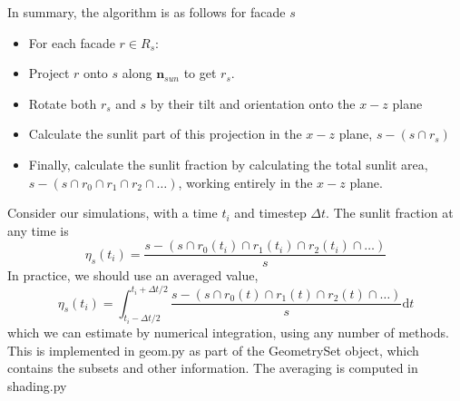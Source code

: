 \documentclass[11pt]{article}
\begin{document}
In summary, the algorithm is as follows for facade $s$

\begin{itemize}
\item For each facade $r \in R_s$:
\item \hspace{0.5cm} Project $r$ onto $s$ along $\mathbf{n}_{sun}$ to get $r_s$.
\item \hspace{0.5cm} Rotate both $r_s$ and $s$ by their tilt and orientation onto the $x-z$ plane
\item \hspace{0.5cm} Calculate the sunlit part of this projection in the $x-z$ plane, $s-(s \cap r_{s})$
\item Finally, calculate the sunlit fraction by calculating the total sunlit area, $s-(s \cap r_{0}\cap r_{1} \cap r_{2} \cap \ldots)$, working entirely in the $x-z$ plane.
\end{itemize}

Consider our simulations, with a time $t_i$ and timestep $\Delta t$. The sunlit fraction at any time is 
\[ 
\eta_{s}(t_i) = \frac{s-(s \cap r_{0}(t_i)\cap r_{1}(t_i) \cap r_{2}(t_i) \cap \ldots) }{s}
\]
In practice, we should use an averaged value,
\[ 
\eta_{s}(t_i) = \int_{t_i-\Delta t/2}^{t_i+\Delta t/2} \frac{s-(s \cap r_{0}(t)\cap r_{1}(t) \cap r_{2}(t) \cap \ldots) }{s} \mathrm{d}t
\]
which we can estimate by numerical integration, using any number of methods. This is implemented in geom.py as part of the GeometrySet object, which contains the subsets and other information. The averaging is computed in shading.py
\end{document}
